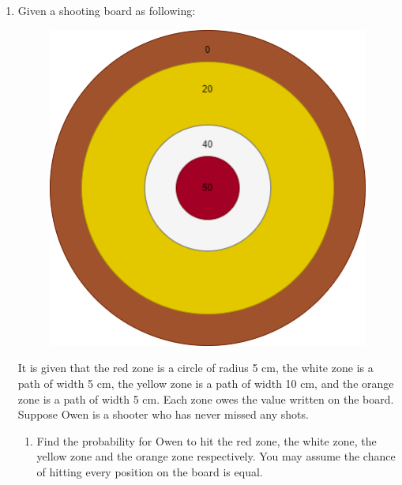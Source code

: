 \documentclass[11pt]{article}
\begin{document}
\begin{enumerate}
        \newpage
        \item Given a shooting board as following:\begin{figure}[H]
            \centering
            \includegraphics[scale=0.6]{shooting_board.png}
        \end{figure} It is given that the red zone is a circle of radius 5 cm, the white zone is a path of width 5 cm, the yellow zone is a path of width 10 cm, and the orange zone is a path of width 5 cm. Each zone owes the value written on the board. Suppose Owen is a shooter who has never missed any shots.\begin{enumerate}
            \item Find the probability for Owen to hit the red zone, the white zone, the yellow zone and the orange zone respectively. You may assume the chance of hitting every position on the board is equal. 
        \end{enumerate}
    \end{enumerate}
\end{document}
